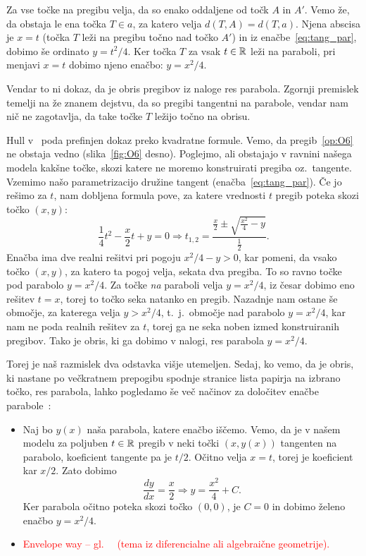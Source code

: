 Za vse točke na pregibu velja, da so enako oddaljene od točk $A$ in $A'$. Vemo že, da obstaja le ena točka $T \in a$, za katero velja $d(T, A) = d(T, a)$. Njena abscisa je $x = t$ (točka $T$ leži na pregibu točno nad točko $A'$) in iz enačbe~\ref{eq:tang_par}, dobimo še ordinato $y = t^2 / 4$. Ker točka $T$ za vsak $t \in \mathbb R$ leži na paraboli, pri menjavi $x = t$ dobimo njeno enačbo: $y = x^2 / 4$.

Vendar to ni dokaz, da je obris pregibov iz naloge res parabola. Zgornji premislek temelji na že znanem dejstvu, da so pregibi tangentni na parabole, vendar nam nič ne zagotavlja, da take točke $T$ ležijo točno na obrisu.

Hull v~\cite[str.\ 55--56]{hull2013} poda prefinjen dokaz preko kvadratne formule. Vemo, da pregib~\ref{op:O6} ne obstaja vedno (slika~\ref{fig:O6} desno). Poglejmo, ali obstajajo v ravnini našega modela kakšne točke, skozi katere ne moremo konstruirati pregiba oz.\ tangente. Vzemimo našo parametrizacijo družine tangent (enačba~\ref{eq:tang_par}). Če jo rešimo za $t$, nam dobljena formula pove, za katere vrednosti $t$ pregib poteka skozi točko $(x, y)$:
$$ \frac{1}{4}t^2 - \frac{x}{2}t + y = 0 \Rightarrow t_{1,2} = \frac{\frac{x}{2} \pm \sqrt{\frac{x^2}{4} - y}}{\frac{1}{2}}.$$
Enačba ima dve realni rešitvi pri pogoju $x^2 / 4 - y > 0$, kar pomeni, da vsako točko $(x, y)$, za katero ta pogoj velja, sekata dva pregiba. To so ravno točke pod parabolo $y = x^2 / 4$. Za točke \emph{na} paraboli velja $y = x^2 / 4$, iz česar dobimo eno rešitev $t = x$, torej to točko seka natanko en pregib. Nazadnje nam ostane še območje, za katerega velja $y > x^2 / 4$, t.\ j.\ območje nad parabolo $y = x^2 / 4$, kar nam ne poda realnih rešitev za $t$, torej ga ne seka noben izmed konstruiranih pregibov. Tako je obris, ki ga dobimo v nalogi, res parabola $y = x^2 / 4$.

Torej je naš razmislek dva odstavka višje utemeljen. Sedaj, ko vemo, da je obris, ki nastane po večkratnem prepogibu spodnje stranice lista papirja na izbrano točko, res parabola, lahko pogledamo še več načinov za določitev enačbe parabole~\cite[str.\ 55--56]{hull2013}:
\begin{itemize}
    \item Naj bo $y(x)$ naša parabola, katere enačbo iščemo. Vemo, da je v našem modelu za poljuben $t \in \mathbb R$ pregib v neki točki $(x, y(x))$ tangenten na parabolo, koeficient tangente pa je $t / 2$. Očitno velja $x = t$, torej je koeficient kar $x / 2$. Zato dobimo
    $$ \frac{dy}{dx} = \frac{x}{2} \Rightarrow y = \frac{x^2}{4} + C. $$
    Ker parabola očitno poteka skozi točko $(0, 0)$, je $C = 0$ in dobimo želeno enačbo $y = x^2 / 4$.
    \item \textcolor{red}{Envelope way -- gl.\ ~\cite[str.\ 56 spodaj]{hull2013} (tema iz diferencialne ali algebraične geometrije).}
\end{itemize}

